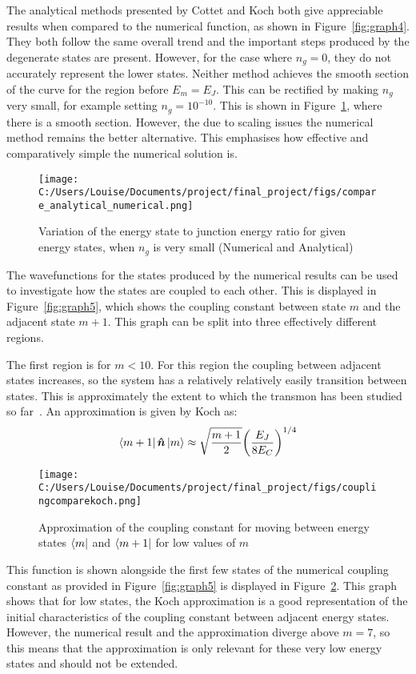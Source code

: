 \documentclass[11pt]{article}
\begin{document}
The analytical methods presented by Cottet and Koch both give appreciable results when compared to the numerical function, as shown in Figure~\ref{fig:graph4}. They both follow the same overall trend and the important steps produced by the degenerate states are present. However, for the case where $n_g = 0$, they do not accurately represent the lower states. Neither method achieves the smooth section of the curve for the region before $E_m = E_J$. This can be rectified by making $n_g$ very small, for example setting $n_g = 10^{-10}$. This is shown in Figure~\ref{fig:graph6}, where there is a smooth section. However, the due to scaling issues the numerical method remains the better alternative. This emphasises how effective and comparatively simple the numerical solution is.

\begin{figure}[ht]
\centering
\texttt{[image: C:/Users/Louise/Documents/project/final\_project/figs/compare\_analytical\_numerical.png]}
\caption{Variation of the energy state to junction energy ratio for given energy states, when $n_g$ is very small (Numerical and Analytical)}
\label{fig:graph6}
\end{figure}



The wavefunctions for the states produced by the numerical results can be used to investigate how the states are coupled to each other. This is displayed in Figure~\ref{fig:graph5}, which shows the coupling constant between state $m$ and the adjacent state $m+1$. This graph can be split into three effectively different regions.

The first region is for $m<10$. For this region the coupling between adjacent states increases, so the system has a relatively relatively easily transition between states. This is approximately the extent to which the transmon has been studied so far~\cite{kochChargeinsensitiveQubitDesign2007}. An approximation is given by Koch as:
\begin{equation} \label{eq:10}
\bra{m+1}\boldsymbol{\hat{n}}\ket{m} \approx \sqrt{\frac{m+1}{2}} \bigg( \frac{E_J}{8E_C}\bigg)^{1/4}
\end{equation}
\begin{figure}[ht]
\centering
\texttt{[image: C:/Users/Louise/Documents/project/final\_project/figs/couplingcomparekoch.png]}
\caption{Approximation of the coupling constant for moving between energy states $\bra{m}$ and $\bra{m+1}$ for low values of $m$}
\label{fig:graph7}
\end{figure}
This function is shown alongside the first few states of the numerical coupling constant as provided in Figure~\ref{fig:graph5} is displayed in Figure~\ref{fig:graph7}. This graph shows that for low states, the Koch approximation is a good representation of the initial characteristics of the coupling constant between adjacent energy states. However, the numerical result and the approximation diverge above $m=7$, so this means that the approximation is only relevant for these very low energy states and should not be extended.
\end{document}
